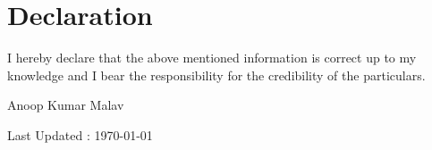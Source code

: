 \documentclass[12pt]{article}
\begin{document}
\begin{comment}
\section*{Educational Qualification}
\begin{tabular}{l l c c}
\textbf{Degree} & \textbf{University / Institute} & \textbf{\% Marks} & \textbf{Year}\\[0.2cm]
B.Tech. & The LNM Institute of Information Technology, Jaipur  & 55.60 & 2012\\[0.2cm]
Senior Secondary Examination & Maa Bharati Vidhya Bhavan, Kota & 84.92 & 2007\\[0.2cm]
Secondary School Examination & Vivek Vardhani Secondary School, Anta  & 86.67 & 2005\\
 & & & \\
\end{tabular}
\end{comment}

\section*{Declaration}
I hereby declare that the above mentioned information is correct up to
my knowledge and I bear the responsibility for the credibility of the particulars.\\
\begin{flushright}
 Anoop Kumar Malav
\end{flushright}
\begin{center}

Last Updated : \today

\end{center}
\end{document}
